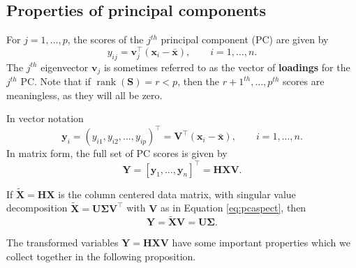 \documentclass[
]{book}
\theoremstyle{definition}
\theoremstyle{definition}
\theoremstyle{definition}
\theoremstyle{definition}
\theoremstyle{remark}
\begin{document}
\hypertarget{properties-of-principal-components}{%
\subsection{Properties of principal components}\label{properties-of-principal-components}}

For \(j=1, \ldots , p\), the scores of the \(j^{th}\) principal component (PC) are given by
\[
y_{ij}=\mathbf v_j^\top(\mathbf x_i - \bar{\mathbf x}), \qquad i=1, \ldots , n.
\]
The \(j^{th}\) eigenvector \(\mathbf v_j\) is sometimes referred to as the vector of \textbf{loadings} for the \(j^{th}\) PC. Note that if \(\operatorname{rank}(\mathbf S)=r<p\), then the \(r+1^{th}, \ldots, p^{th}\) scores are meaningless, as they will all be zero.

In vector notation
\[
\mathbf y_i=( y_{i1}, y_{i2}, \ldots , y_{ip})^\top = \mathbf V^\top (\mathbf x_i -\bar{\mathbf x}), \qquad i=1, \ldots ,n.
\]
In matrix form, the full set of PC scores is given by
\[
\mathbf Y= [\mathbf y_1 , \ldots , \mathbf y_n]^\top =\mathbf H\mathbf X\mathbf V.
\]

If \(\tilde{\mathbf X}=\mathbf H\mathbf X\) is the column centered data matrix, with singular value decomposition
\(\tilde{\mathbf X}=\mathbf U\boldsymbol{\Sigma}\mathbf V^\top\) with \(\mathbf V\) as in Equation \eqref{eq:pcaspect}, then
\[\mathbf Y= \tilde{\mathbf X}\mathbf V= \mathbf U\boldsymbol{\Sigma}.\]

The transformed variables \(\mathbf Y= \mathbf H\mathbf X\mathbf V\) have some important properties which we collect together in the following proposition.
\end{document}
